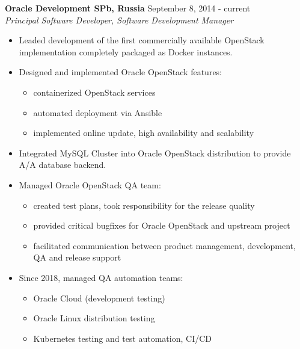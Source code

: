 \documentclass[a4paper,12pt,]{article}
\begin{document}
  \begin{description}

  \item{\bfseries Oracle Development SPb, Russia} \hfill September 8, 2014 - current \\
    {\em Principal Software Developer, Software Development Manager}

    \begin{itemize}

    \item Leaded development of the first commercially available OpenStack implementation completely packaged as Docker instances.

    \item Designed and implemented Oracle OpenStack features:
        \begin{itemize}
        \item containerized OpenStack services
        \item automated deployment via Ansible
        \item implemented online update, high availability and scalability
        \end{itemize}

    \item Integrated MySQL Cluster into Oracle OpenStack distribution to provide A/A database backend.

    \item Managed Oracle OpenStack QA team:
        \begin{itemize}
        \item created test plans, took responsibility for the release quality
        \item provided critical bugfixes for Oracle OpenStack and upstream project
        \item facilitated communication between product management, development, QA and release support
		\end{itemize}

    \item Since 2018, managed QA automation teams:
        \begin{itemize}
        \item Oracle Cloud (development testing)
        \item Oracle Linux distribution testing
        \item Kubernetes testing and test automation, CI/CD
        \end{itemize}


\end{itemize}
\end{description}
\end{document}
